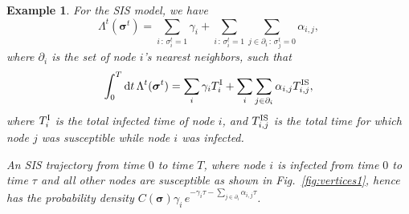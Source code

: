 \documentclass[english,10pt,aps,pra,twocolumn,superscriptaddress,floatfix,fleqn]{revtex4-2}
\newcommand{\ud}{\mathrm{d}}
\renewcommand{\vec}[1]{{\boldsymbol{#1}}}
\newcommand{\vs}{\vec{\sigma}}
\newcommand{\tI}{\textnormal{I}}
\newcommand{\tS}{\textnormal{S}}
\newtheorem{example}{Example}
\begin{document}
\begin{example}\label{ex:trajectory1}
For the SIS model, we have
\begin{equation}
	\Lambda^t(\vs^t)=\sum_{i\,:\,\sigma^t_i=1} \gamma_i + \sum_{i\,:\,\sigma^t_i=1} \sum_{j\in\partial_i\,:\,\sigma^t_j=0} \alpha_{i,j},
\end{equation}
where $\partial_i$ is the set of node $i$'s nearest neighbors, such that
\begin{equation}
	\int_0^T\ud t\,\Lambda^t(\vs^t)=\sum_i \gamma_i T^\tI_i+\sum_i\sum_{j\in\partial_i} \alpha_{i,j} T^{\tI\tS}_{i,j},
\end{equation}
where $T^\tI_i$ is the total infected time of node $i$, and $T^{\tI\tS}_{i,j}$ is the total time for which node $j$ was susceptible while node $i$ was infected.

An SIS trajectory from time $0$ to time $T$, where node $i$ is infected from time $0$ to time $\tau$ and all other nodes are susceptible as shown in Fig.~\ref{fig:vertices1}, hence has the probability density
$C(\vs) \gamma_i\, e^{-\gamma_i \tau -\sum_{j\in\partial_i}\alpha_{i,j}\tau}$.
\end{example}
\end{document}
